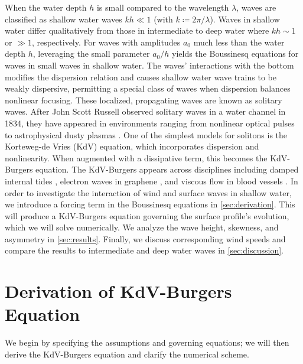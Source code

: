 \documentclass{jfm}
\begin{document}
When the water depth $h$ is small compared to the wavelength $\lambda$,
waves are classified as shallow water waves $kh \ll 1$ (with $k
\coloneqq 2 \pi/\lambda$).
Waves in shallow water differ qualitatively from those in intermediate
to deep water where $kh \sim 1$ or $\gg 1$, respectively.
For waves with amplitudes $a_0$ much less than the water depth $h$,
leveraging the small parameter $a_0/h$ yields the Boussinesq equations
for waves in small waves in shallow water.
The waves' interactions with the bottom modifies the dispersion relation
and causes shallow water wave trains to be weakly dispersive, permitting
a special class of waves when dispersion balances nonlinear focusing.
These localized, propagating waves are known as solitary waves.
After John Scott Russell observed solitary waves in a water channel in 1834,
they have appeared in environments ranging from nonlinear optical pulses
\citep[\eg][]{kivshar1993dark} to astrophysical dusty plasmas
\citep[\eg][]{sahu2012nonextensive}.
One of the simplest models for solitons is the Korteweg-de Vries (KdV)
equation, which incorporates dispersion and nonlinearity.
When augmented with a dissipative term, this becomes the KdV-Burgers
equation.
The KdV-Burgers appears across disciplines including damped internal
tides \citep[\eg][]{sandstrom1995dissipation}, electron waves in
graphene \citep[\eg][]{zdyrski2019effects}, and viscous flow in blood
vessels \citep[\eg][]{antar1999weakly}.
In order to investigate the interaction of wind and surface waves in
shallow water, we introduce a forcing term in the Boussinesq equations
in \cref{sec:derivation}.
This will produce a KdV-Burgers equation governing the surface profile's
evolution, which we will solve numerically.
We analyze the wave height, skewness, and asymmetry in
\cref{sec:results}.
Finally, we discuss corresponding wind speeds and compare the results to
intermediate and deep water waves in \cref{sec:discussion}.

\section{\label{sec:derivation} Derivation of KdV-Burgers Equation}
We begin by specifying the assumptions and governing equations; we will
then derive the KdV-Burgers equation and clarify the numerical scheme.
\end{document}

